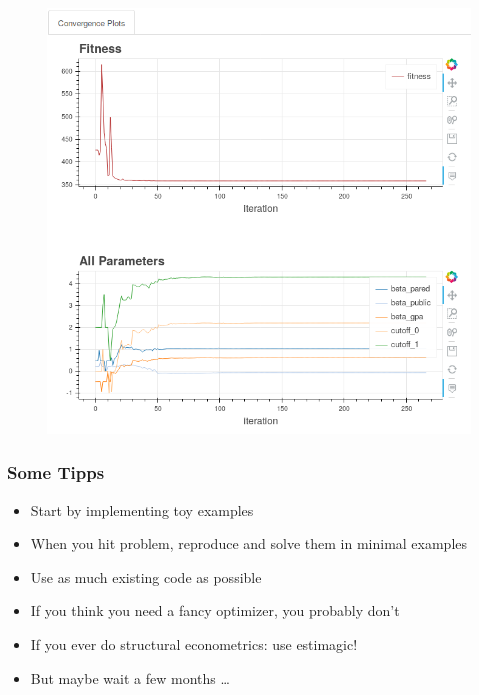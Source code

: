 \documentclass[11pt]{beamer}
\begin{document}
\begin{frame}[c]%
    \begin{figure}
        \includegraphics[height=\textheight]{figures/convergence_plot.png}
    \end{figure}
\end{frame}


\begin{frame}[c]\frametitle{Some Tipps}
    \begin{itemize}
        \item Start by implementing toy examples
        \item When you hit problem, reproduce and solve them in minimal examples
        \item Use as much existing code as possible
        \item If you think you need a fancy optimizer, you probably don't
        \item If you ever do structural econometrics: use estimagic!
        \item But maybe wait a few months \ldots
    \end{itemize}
\end{frame}



\end{document}
